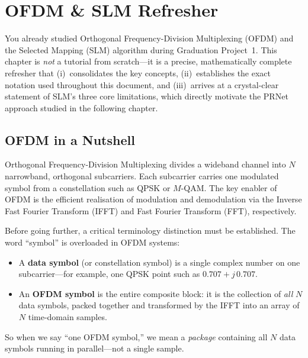 \chapter{OFDM \& SLM Refresher}
\label{ch:refresher}

\begin{motivation}
    You already studied Orthogonal Frequency-Division Multiplexing (OFDM) and the Selected Mapping (SLM) algorithm during Graduation Project~1. This chapter is \emph{not} a tutorial from scratch---it is a precise, mathematically complete refresher that (i)~consolidates the key concepts, (ii)~establishes the exact notation used throughout this document, and (iii)~arrives at a crystal-clear statement of SLM's three core limitations, which directly motivate the PRNet approach studied in the following chapter.
\end{motivation}

\section{OFDM in a Nutshell}

Orthogonal Frequency-Division Multiplexing divides a wideband channel into $N$ narrowband, orthogonal subcarriers.  Each subcarrier carries one modulated symbol from a constellation such as QPSK or $M$-QAM.  The key enabler of OFDM is the efficient realisation of modulation and demodulation via the Inverse Fast Fourier Transform (IFFT) and Fast Fourier Transform (FFT), respectively.

Before going further, a critical terminology distinction must be established. The word ``symbol'' is overloaded in OFDM systems:
\begin{itemize}
    \item A \textbf{data symbol} (or constellation symbol) is a single complex number on one subcarrier---for example, one QPSK point such as $0.707+j\,0.707$.
    \item An \textbf{OFDM symbol} is the entire composite block: it is the collection of \emph{all} $N$ data symbols, packed together and transformed by the IFFT into an array of $N$ time-domain samples.
\end{itemize}
So when we say ``one OFDM symbol,'' we mean a \emph{package} containing all $N$ data symbols running in parallel---not a single sample.

